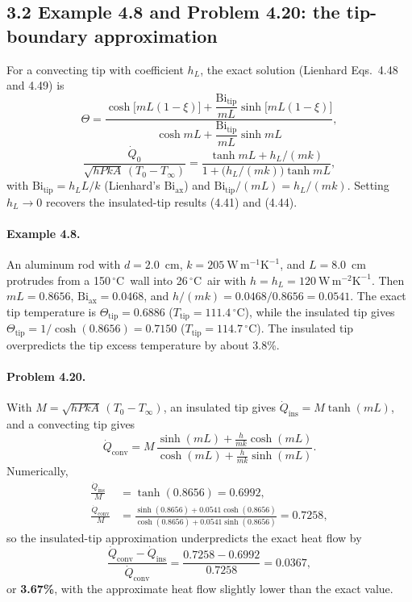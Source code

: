 \documentclass[reprint, amsmath, amssymb, aps, prl]{revtex4-2}
\newcommand{\Qdot}{\dot Q}
\newcommand{\degC}{\ensuremath{\,^\circ\mathrm{C}}}
\newcommand{\WmK}{\mathrm{W\,m^{-1}K^{-1}}}
\newcommand{\WmmK}{\mathrm{W\,m^{-2}K^{-1}}}
\begin{document}
\subsection*{3.2 Example 4.8 and Problem 4.20: the tip-boundary approximation}

For a convecting tip with coefficient $h_L$, the exact solution (Lienhard Eqs.~4.48 and
4.49) is
\begin{equation*}
\Theta=\frac{\cosh\big[mL(1-\xi)\big]+\dfrac{\mathrm{Bi_{tip}}}{mL}\sinh\big[mL(1-\xi)\big]}
{\cosh mL+\dfrac{\mathrm{Bi_{tip}}}{mL}\sinh mL},
\end{equation*}
\begin{equation*}
\frac{\Qdot_0}{\sqrt{hPkA}\,(T_0-T_\infty)}
=\frac{\tanh mL+h_L/(mk)}{1+\big(h_L/(mk)\big)\tanh mL},
\end{equation*}
with $\mathrm{Bi_{tip}}=h_LL/k$ (Lienhard's $\mathrm{Bi_{ax}}$) and
$\mathrm{Bi_{tip}}/(mL)=h_L/(mk)$. Setting $h_L\to0$ recovers the insulated-tip results
(4.41) and (4.44).

\paragraph*{Example 4.8.}
An aluminum rod with $d=2.0$~cm, $k=205~\WmK$, and $L=8.0$~cm protrudes from a 150\degC\
wall into 26\degC\ air with $h=h_L=120~\WmmK$. Then $mL=0.8656$,
$\mathrm{Bi_{ax}}=0.0468$, and $h/(mk)=0.0468/0.8656=0.0541$. The exact tip temperature
is $\Theta_{\mathrm{tip}}=0.6886$ ($T_{\mathrm{tip}}=111.4\degC$), while the insulated tip
gives $\Theta_{\mathrm{tip}}=1/\cosh(0.8656)=0.7150$ ($T_{\mathrm{tip}}=114.7\degC$). The
insulated tip overpredicts the tip excess temperature by about 3.8\%.

\paragraph*{Problem 4.20.}
With $M=\sqrt{hPkA}\,(T_0-T_\infty)$, an insulated tip gives
$\Qdot_{\mathrm{ins}}=M\tanh(mL)$, and a convecting tip gives
\begin{equation*}
\Qdot_{\mathrm{conv}}
=M\,\frac{\sinh(mL)+\frac{h}{mk}\cosh(mL)}{\cosh(mL)+\frac{h}{mk}\sinh(mL)}.
\end{equation*}
Numerically,
\begin{align*}
\frac{\Qdot_{\mathrm{ins}}}{M}&=\tanh(0.8656)=0.6992,\\
\frac{\Qdot_{\mathrm{conv}}}{M}
&=\frac{\sinh(0.8656)+0.0541\cosh(0.8656)}{\cosh(0.8656)+0.0541\sinh(0.8656)}=0.7258,
\end{align*}
so the insulated-tip approximation underpredicts the exact heat flow by
\begin{equation*}
\frac{\Qdot_{\mathrm{conv}}-\Qdot_{\mathrm{ins}}}{\Qdot_{\mathrm{conv}}}
=\frac{0.7258-0.6992}{0.7258}=0.0367,
\end{equation*}
or \textbf{3.67\%}, with the approximate heat flow slightly lower than the exact value.
\end{document}
